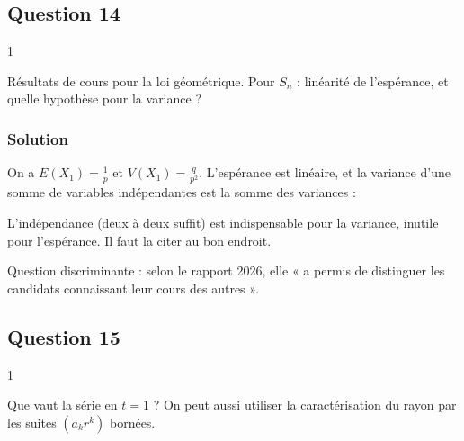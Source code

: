 \documentclass[11pt,a4paper]{article}
\newcommand{\equationajustee}[1]{%
  \sbox{\boiteequation}{$\displaystyle #1$}%
  \ifdim\wd\boiteequation>\linewidth
    \[\resizebox{\linewidth}{!}{\usebox{\boiteequation}}\]%
  \else
    \[#1\]%
  \fi}
\begin{document}
\hypertarget{question-14}{%
\subsection{Question 14}\label{question-14}}

\begin{indication}{1}

Résultats de cours pour la loi géométrique. Pour \(S_n\) : linéarité de l'espérance, et quelle hypothèse pour la variance ?

\end{indication}

\hypertarget{solution-13}{%
\subsubsection{Solution}\label{solution-13}}

On a \(E(X_1)=\frac1p\) et \(V(X_1)=\frac q{p^2}\). L'espérance est linéaire, et la variance d'une somme de variables indépendantes est la somme des variances :
\equationajustee{\boxed{\begin{aligned}E(S_n)&=\frac np,\\ V(S_n)&=\frac{nq}{p^2}.\end{aligned}}}

\begin{piege}

L'indépendance (deux à deux suffit) est indispensable pour la variance, inutile pour l'espérance. Il faut la citer au bon endroit.

\end{piege}

\begin{jury}

Question discriminante : selon le rapport 2026, elle « a permis de distinguer les candidats connaissant leur cours des autres ».

\end{jury}

\hypertarget{question-15}{%
\subsection{Question 15}\label{question-15}}

\begin{indication}{1}

Que vaut la série en \(t=1\) ? On peut aussi utiliser la caractérisation du rayon par les suites \((a_kr^k)\) bornées.

\end{indication}
\end{document}

